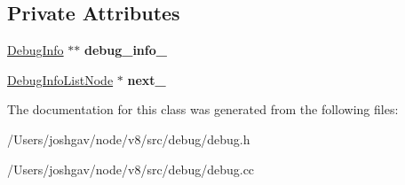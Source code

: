 \subsection*{Private Attributes}
\begin{DoxyCompactItemize}
\item 
\hyperlink{classv8_1_1internal_1_1_debug_info}{Debug\+Info} $\ast$$\ast$ {\bfseries debug\+\_\+info\+\_\+}\hypertarget{classv8_1_1internal_1_1_debug_info_list_node_a712daf2363e5e99cca208552151c5633}{}\label{classv8_1_1internal_1_1_debug_info_list_node_a712daf2363e5e99cca208552151c5633}

\item 
\hyperlink{classv8_1_1internal_1_1_debug_info_list_node}{Debug\+Info\+List\+Node} $\ast$ {\bfseries next\+\_\+}\hypertarget{classv8_1_1internal_1_1_debug_info_list_node_a1130b2cd03f4e0e4e51f89425f2ab8dd}{}\label{classv8_1_1internal_1_1_debug_info_list_node_a1130b2cd03f4e0e4e51f89425f2ab8dd}

\end{DoxyCompactItemize}


The documentation for this class was generated from the following files\+:\begin{DoxyCompactItemize}
\item 
/\+Users/joshgav/node/v8/src/debug/debug.\+h\item 
/\+Users/joshgav/node/v8/src/debug/debug.\+cc\end{DoxyCompactItemize}
